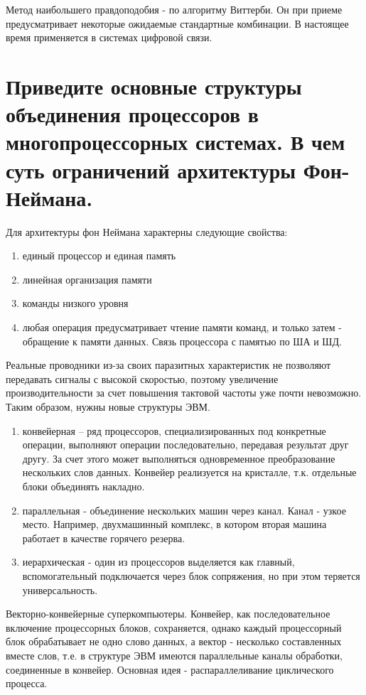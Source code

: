 \documentclass[unicode, 12pt, a4paper, oneside]{article}
\begin{document}
Метод наибольшего правдоподобия - по алгоритму Виттерби. Он при приеме предусматривает некоторые ожидаемые стандартные комбинации. В настоящее время применяется в системах цифровой связи.

\section{Приведите основные структуры объединения процессоров в многопроцессорных системах. В чем суть ограничений архитектуры Фон-Неймана.}

Для архитектуры фон Неймана характерны следующие свойства:
\begin{enumerate}
\item единый процессор и единая память
\item линейная организация памяти
\item команды низкого уровня
\item любая операция предусматривает чтение памяти команд, и только затем - обращение к памяти данных. Связь процессора с памятью по ША и ШД.
\end{enumerate}

Реальные проводники из-за своих паразитных характеристик не позволяют передавать сигналы с высокой скоростью, поэтому увеличение производительности за счет повышения тактовой частоты уже почти невозможно. Таким образом, нужны новые структуры ЭВМ.
\begin{enumerate}
\item конвейерная – ряд процессоров, специализированных под конкретные операции, выполняют операции последовательно, передавая результат друг другу. За счет этого может выполняться одновременное преобразование нескольких слов данных. Конвейер реализуется на кристалле, т.к. отдельные блоки объединять накладно.
\item параллельная - объединение нескольких машин через канал. Канал - узкое место. Например, двухмашинный комплекс, в котором вторая машина работает в качестве горячего резерва.
\item иерархическая - один из процессоров выделяется как главный, вспомогательный подключается через блок сопряжения, но при этом теряется универсальность.
\end{enumerate}

Векторно-конвейерные суперкомпьютеры. Конвейер, как последовательное включение процессорных блоков, сохраняется, однако каждый процессорный блок обрабатывает не одно слово данных, а вектор - несколько составленных вместе слов, т.е. в структуре ЭВМ имеются параллельные каналы обработки, соединенные в конвейер. Основная идея - распараллеливание циклического процесса.
\end{document}
